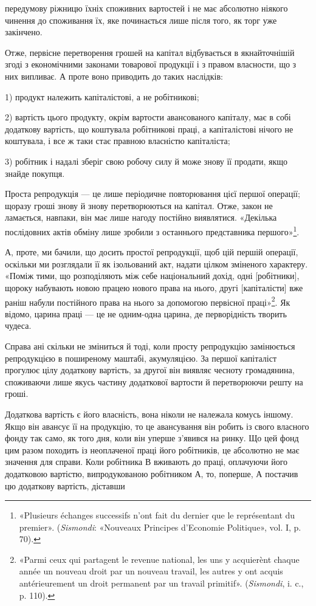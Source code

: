 \parcont{}  %
передумову ріжницю їхніх споживних вартостей і не має абсолютно
ніякого чинення до споживання їх, яке починається лише
після того, як торг уже закінчено.

Отже, первісне перетворення грошей на капітал відбувається
в якнайточнішій згоді з економічними законами товарової продукції
і з правом власности, що з них випливає. А проте воно
приводить до таких наслідків:

1) продукт належить капіталістові, а не робітникові;

2) вартість цього продукту, окрім вартости авансованого капіталу,
має в собі додаткову вартість, що коштувала робітникові
праці, а капіталістові нічого не коштувала, і все ж таки стає
правною власністю капіталіста;

3) робітник і надалі зберіг свою робочу силу й може знову її
продати, якщо знайде покупця.

Проста репродукція — це лише періодичне повторювання
цієї першої операції; щоразу гроші знову й знову перетворюються
на капітал. Отже, закон не ламається, навпаки, він
має лише нагоду постійно виявлятися. «Декілька послідовних
актів обміну лише зробили з останнього представника першого»\footnote*{
«Plusieurs échanges successifs n’ont fait du dernier que le représentant
du premier». (\emph{Sismondi}: «Nouveaux Principes d’Economie Politique»,
vol. I, p. 70).
}.

А, проте, ми бачили, що досить простої репродукції, щоб цій
першій операції, оскільки ми розглядали її як ізольований акт,
надати цілком зміненого характеру. «Поміж тими, що розподіляють
між себе національний дохід, одні [робітники], щороку
набувають новою працею нового права на нього, другі [капіталісти]
вже раніш набули постійного права на нього за допомогою
первісної праці»\footnote*{
«Parmi ceux qui partagent le revenue national, les uns y acquierènt
chaque année un nouveau droit par un nouveau travail, les autres y ont acquis
antérieurement un droit permanent par un travail primitif». (\emph{Sismondi},
i. c., p. 110).
}. Як відомо, царина праці — це не одним-одна
царина, де перворідність творить чудеса.

Справа ані скільки не зміниться й тоді, коли просту репродукцію
замінюється репродукцією в поширеному маштабі, акумуляцією.
За першої капіталіст прогулює цілу додаткову вартість,
за другої він виявляє чесноту громадянина, споживаючи
лише якусь частину додаткової вартости й перетворюючи решту
на гроші.

Додаткова вартість є його власність, вона ніколи не належала
комусь іншому. Якщо він авансує її на продукцію, то це авансування
він робить із свого власного фонду так само, як того
дня, коли він уперше з’явився на ринку. Що цей фонд цим разом
походить із неоплаченої праці його робітників, це абсолютно не
має значення для справи. Коли робітника В вживають до праці,
оплачуючи його додатковою вартістю, випродукованою робітником
А, то, поперше, А постачив цю додаткову вартість, діставши
\parbreak{}  %
